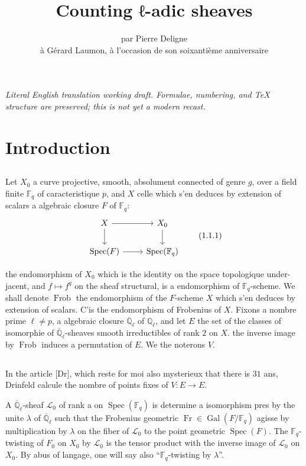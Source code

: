 \documentclass[11pt,a4paper]{article}
\title{Counting ℓ-adic sheaves}
\author{par Pierre Deligne\\[.5em]
\small \`a G\'erard Laumon, \`a l'occasion de son soixanti\`eme anniversaire}
\date{}
\theoremstyle{plain}
\theoremstyle{definition}
\DeclareMathOperator{\Spec}{Spec}
\DeclareMathOperator{\Gal}{Gal}
\DeclareMathOperator{\Frob}{Frob}
\DeclareMathOperator{\Fr}{Fr}
\newcommand{\Q}{\mathbb{Q}}
\newcommand{\F}{\mathbb{F}}
\newcommand{\Ql}{\overline{\mathbb{Q}}_\ell}
\begin{document}
\begin{center}\small\emph{Literal English translation working draft. Formulae, numbering, and TeX structure are preserved; this is not yet a modern recast.}\end{center}
\vspace{0.5em}


\maketitle

\section{Introduction}

\subsection{}
Let $X_0$ a curve projective, smooth, absolument connected of genre $g$, over a field finite $\F_q$ of caracteristique $p$, and $X$ celle which s'en deduces by extension of scalars a algebraic closure $F$ of $\F_q$:
\begin{equation}
\begin{tikzcd}
X \arrow[r] \arrow[d] & X_0 \arrow[d] \\
\Spec(F) \arrow[r] & \Spec(\F_q)
\end{tikzcd}
\tag{1.1.1}
\end{equation}

the endomorphism of $X_0$ which is the identity on the space topologique under-jacent, and $f \mapsto f^q$ on the sheaf structural, is a endomorphism of $\F_q$-scheme. We shall denote $\Frob$ the endomorphism of the $F$-scheme $X$ which s'en deduces by extension of scalars. C'is the endomorphism of Frobenius of $X$. Fixons a nombre prime $\ell \neq p$, a algebraic closure $\Ql$ of $\Q_\ell$, and let $E$ the set of the classes of isomorphie of $\Ql$-sheaves smooth irreductibles of rank $2$ on $X$. the inverse image by $\Frob$ induces a permutation of $E$. We the noterons $V$.

\subsection{}
In the article [Dr], which reste for moi also mysterieux that there is $31$ ans, Drinfeld calcule the nombre of points fixes of $V: E \to E$.

A $\Ql$-sheaf $\mathcal{L}_0$ of rank a on $\Spec(\F_q)$ is determine a isomorphism pres by the unite $\lambda$ of $\Ql$ such that the Frobenius geometric $\Fr \in \Gal(F/\F_q)$ agisse by multiplication by $\lambda$ on the fiber of $\mathcal{L}_0$ to the point geometric $\Spec(F)$. The $\F_q$-twisting of $F_0$ on $X_0$ by $\mathcal{L}_0$ is the tensor product with the inverse image of $\mathcal{L}_0$ on $X_0$. By abus of langage, one will say also ``$\F_q$-twisting by $\lambda$''.
\end{document}
